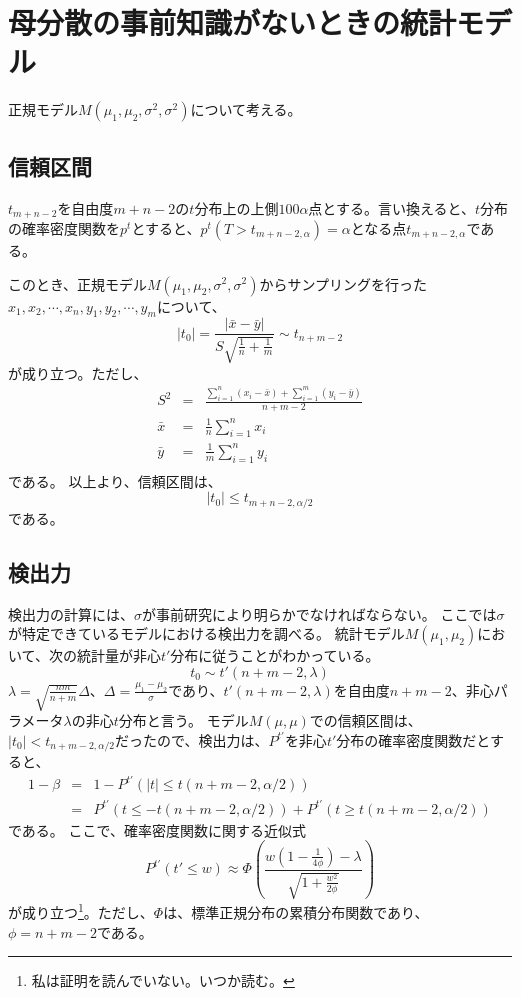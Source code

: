 \section{母分散の事前知識がないときの統計モデル}
正規モデル$M(\mu_1,\mu_2,\sigma^2,\sigma^2)$について考える。

\subsection{信頼区間}
$t_{m+n-2}$を自由度$m+n-2$の$t$分布上の上側$100\alpha$点とする。言い換えると、$t$分布の確率密度関数を$p^t$とすると、$p^t(T > t_{m+n-2,\alpha}) = \alpha$となる点$t_{m+n-2,\alpha}$である。

このとき、正規モデル$M(\mu_1,\mu_2,\sigma^2,\sigma^2)$からサンプリングを行った$x_1,x_2,\cdots,x_n,y_1,y_2,\cdots,y_m$について、
\begin{equation*}
    |t_0| = \frac{|\bar{x}-\bar{y}|}{S\sqrt{\frac{1}{n}+\frac{1}{m}}}\sim t_{n+m-2}
\end{equation*}
が成り立つ。ただし、
\begin{eqnarray*}
    S^2 &=& \frac{\sum_{i=1}^n(x_i-\bar{x})+\sum_{i=1}^m (y_i-\bar{y})}{n+m-2} \\
    \bar{x} &=& \frac{1}{n}\sum_{i=1}^n x_i\\
    \bar{y} &=& \frac{1}{m}\sum_{i=1}^n y_i\\
\end{eqnarray*}
である。
以上より、信頼区間は、
\begin{equation*}
    |t_0| \leq t_{m+n-2,\alpha/2}
\end{equation*}
である。

\subsection{検出力}
検出力の計算には、$\sigma$が事前研究により明らかでなければならない。
ここでは$\sigma$が特定できているモデルにおける検出力を調べる。
統計モデル$M(\mu_1,\mu_2)$において、次の統計量が非心$t'$分布に従うことがわかっている。
\begin{equation*}
     t_0\sim t'(n+m-2,\lambda)
\end{equation*}
$\lambda = \sqrt{\frac{nm}{n+m}}\Delta$、$\Delta =\frac{\mu_1-\mu_2}{\sigma}$であり、$t'(n+m-2,\lambda)$を自由度$n+m-2$、非心パラメータ$\lambda$の非心$t$分布と言う。
モデル$M(\mu,\mu)$での信頼区間は、$|t_0|<t_{n+m-2,\alpha/2}$だったので、検出力は、$P^{t'}$を非心$t'$分布の確率密度関数だとすると、
\begin{eqnarray*}
    1-\beta &=& 1-P^{t'}( |t| \leq t(n+m-2,\alpha/2)) \\
    &=& P^{t'}( t \leq -t(n+m-2,\alpha/2))+P^{t'}(t \geq t(n+m-2,\alpha/2))
\end{eqnarray*}
である。
ここで、確率密度関数に関する近似式
\begin{equation*}
    P^{t'}(t'\leq w) \approx \varPhi \left( \frac{w(1-\frac{1}{4\phi})-\lambda}{\sqrt{1+\frac{w^2}{2\phi}}} \right)
\end{equation*}
が成り立つ\cite{2003サンプルサイズの決め方}\footnote{私は証明を読んでいない。いつか読む。}。ただし、$\varPhi$は、標準正規分布の累積分布関数であり、$\phi=n+m-2$である。

